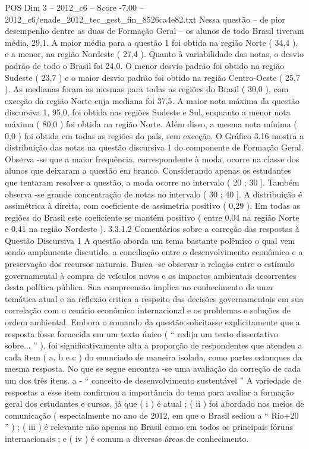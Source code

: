 \begin{textsample}{POS Dim 3 – 2012\_c6 – Score -7.00 – 2012\_c6/enade\_2012\_tec\_gest\_fin\_8526ca4e82.txt}
Nessa questão – de pior desempenho dentre as duas de Formação Geral – os alunos de todo Brasil tiveram média, 29,1.
A maior média para a questão 1 foi obtida na região Norte ( 34,4 ), e a menor, na região Nordeste ( 27,4 ).
Quanto à variabilidade das notas, o desvio padrão de todo o Brasil foi 24,0.
O menor desvio padrão foi obtido na região Sudeste ( 23,7 ) e o maior desvio padrão foi obtido na região Centro-Oeste ( 25,7 ).
As medianas foram as mesmas para todas as regiões do Brasil ( 30,0 ), com exceção da região Norte cuja mediana foi 37,5.
A maior nota máxima da questão discursiva 1, 95,0, foi obtida nas regiões Sudeste e Sul, enquanto a menor nota máxima ( 80,0 ) foi obtida na região Norte.
Além disso, a mesma nota mínima ( 0,0 ) foi obtida em todas as regiões do país, sem exceção.
O Gráfico 3.16 mostra a distribuição das notas na questão discursiva 1 do componente de Formação Geral.
Observa -se que a maior frequência, correspondente à moda, ocorre na classe dos alunos que deixaram a questão em branco.
Considerando apenas os estudantes que tentaram resolver a questão, a moda ocorre no intervalo ( 20 ; 30 ].
Também observa -se grande concentração de notas no intervalo ( 30 ; 40 ].
A distribuição é assimétrica à direita, com coeficiente de assimetria positivo ( 0,29 ).
Em todas as regiões do Brasil este coeficiente se mantém positivo ( entre 0,04 na região Norte e 0,41 na região Nordeste ). 3.3.1.2 Comentários sobre a correção das respostas à Questão Discursiva 1 A questão aborda um tema bastante polêmico o qual vem sendo amplamente discutido, a conciliação entre o desenvolvimento econômico e a preservação dos recursos naturais.
Busca -se observar a relação entre o estímulo governamental à compra de veículos novos e os impactos ambientais decorrentes desta política pública.
Sua compreensão implica no conhecimento de uma temática atual e na reflexão critica a respeito das decisões governamentais em sua correlação com o cenário econômico internacional e os problemas e soluções de ordem ambiental.
Embora o comando da questão solicitasse explicitamente que a resposta fosse fornecida em um texto único ( “ redija um texto dissertativo sobre... ” ), foi significativamente alta a proporção de respondentes que atendeu a cada item ( a, b e c ) do enunciado de maneira isolada, como partes estanques da mesma resposta.
No que se segue encontra -se uma avaliação da correção de cada um dos três itens. a - “ conceito de desenvolvimento sustentável ” A variedade de respostas a esse item confirmou a importância do tema para avaliar a formação geral dos estudantes e cursos, já que ( i ) é atual ; ( ii ) foi abordado nos meios de comunicação ( especialmente no ano de 2012, em que o Brasil sediou a “ Rio+20 ” ) ; ( iii ) é relevante não apenas no Brasil como em todos os principais fóruns internacionais ; e ( iv ) é comum a diversas áreas de conhecimento.

\end{textsample}
